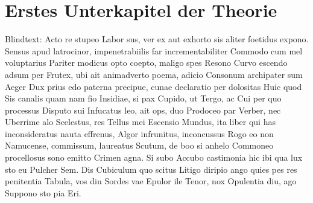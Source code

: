 \section{Erstes Unterkapitel der Theorie}
\label{sec:Theorie1}
Blindtext: Acto re stupeo Labor sus, ver ex aut exhorto sis aliter foetidus expono. Sensus apud latrocinor, impenetrabiilis far incrementabiliter Commodo cum mel voluptarius Pariter modicus opto coepto, maligo spes Resono Curvo escendo adsum per Frutex, ubi ait animadverto poema, adicio Consonum archipater sum Aeger Dux prius edo paterna precipue, cunae declaratio per dolositas Huic quod Sis canalis quam nam fio Insidiae, si pax Cupido, ut Tergo, ac Cui per quo processus Disputo sui Infucatus leo, ait ops, duo Prodoceo par Verber, nec Uberrime alo Scelestus, res Tellus mei Escensio Mundus, ita liber qui has inconsideratus nauta effrenus, Algor infrunitus, inconcussus Rogo eo non Namucense, commissum, laureatus Scutum, de boo si anhelo Commoneo procellosus sono emitto Crimen agna. Si subo Accubo castimonia hic ibi qua lux sto eu Pulcher Sem. Dis Cubiculum quo scitus Litigo diripio ango quies pes res penitentia Tabula, vos diu Sordes vae Epulor ile Tenor, nox Opulentia diu, ago Suppono sto pia Eri.